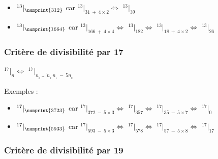 \documentclass[a4paper]{article}
\begin{document}
\begin{Large}
\begin{itemize}

	\item[] $ ^{13}|_{\numprint{312}}$ {\normalsize car} $^{13}|_{31~+~4\times2} \Leftrightarrow$ $^{13}|_{39}$
	\item[] $ ^{13}|_{\numprint{1664}}$ {\normalsize car} $^{13}|_{166~+~4\times4} \Leftrightarrow$ $^{13}|_{182} \Leftrightarrow$ $^{13}|_{18~+~4\times2} \Leftrightarrow$ $^{13}|_{26} $\\

\end{itemize}
\end{Large}

\pagebreak








\subsubsection*{Critère de divisibilité par 17}

\begin{center}
	\huge
	$ ^{17}|_n \Leftrightarrow$ $^{17}|_{\overline{n_{_{k}}~\dots~n_{_2}~n_{_1}}~-~5n_{_0}} $
\end{center}

{ \parindent=0.5cm Exemples : }

\begin{Large}
\begin{itemize}

	\item[] $ ^{17}|_{\numprint{3723}}$ {\normalsize car} $^{17}|_{372~-~5\times3} \Leftrightarrow$ $^{17}|_{357} \Leftrightarrow$ $^{17}|_{35~-~5\times7} \Leftrightarrow$ $^{17}|_{0}$
	\item[] $ ^{17}|_{\numprint{5933}}$ {\normalsize car} $^{17}|_{593~-~5\times3} \Leftrightarrow$ $^{17}|_{578} \Leftrightarrow$ $^{17}|_{57~-~5\times8} \Leftrightarrow$ $^{17}|_{17} $\\

\end{itemize}
\end{Large}

\vfill
{\noindent \dotfill}


\subsubsection*{Critère de divisibilité par 19}
\end{document}
